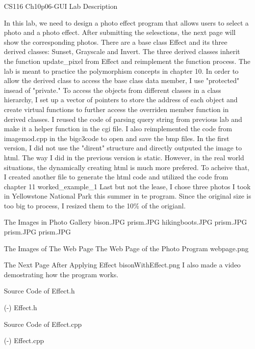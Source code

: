 

\tit CS116 Ch10p06-GUI
\sec Lab Description 

In this lab, we need to design a photo effect program that allows users to select a photo and a photo effect. 
After submitting the selesctions,
the next page will show the corresponding photos.
There are a base class Effect and its three derived classes: Sunset, Grayscale and Invert.
The three derived classes inherit the function update\_pixel from Effect and reimplement the function process.
The lab is meant to practice the polymorphism concepts in chapter 10.
In order to allow the derived class to access the base class data member, 
I use "protected" insead of "private."
To access the objects from different classes in a class hierarchy, 
I set up a vector of pointers to store the address of each object and 
create virtual functions to further access the overriden member function in derived classes.
I reused the code of parsing query string from previous lab and make it a helper function in the cgi file.
I also reimplemented the code from imagemod.cpp in the bigc3code to open and save the bmp files.
In the first version, I did not use the "dirent" structure and directly outputed the image to html.  
The way I did in the previous version is static. However, in the real world situations, the dynamically creating html
is much more prefered. To acheive that, I created another file to generate the html code and utilized the code from chapter 11
worked_example_1
Last but not the lease, I chose three photos I took in Yellowstone National Park this summer in te program.
Since the original size is too big to process, I resized them to the 10\% of the origianl.

\filbreak
\sec The Images in Photo Gallery 
\picw=4in \inspic bison.JPG
\picw=4in \inspic prism.JPG
\picw=4in \inspic hikingboots.JPG
\picw=4in \inspic prism.JPG
\picw=4in \inspic prism.JPG
\picw=4in \inspic prism.JPG


\sec The Images of The Web Page
The Web Page of the Photo Program
\nl
\picw=6in \inspic webpage.png
\filbreak

The Next Page After Applying Effect 
\nl
\picw=4in \inspic bisonWithEffect.png
\nl
I also made a video demostrating how the program works. 

\filbreak
\sec Source Code of Effect.h

\verbinput (-) Effect.h

\filbreak
\sec Source Code of Effect.cpp

\verbinput (-) Effect.cpp

